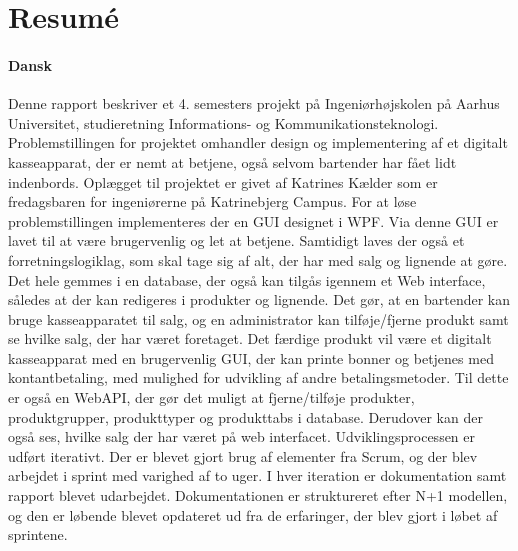\chapter{Resumé}
\subsubsection*{Dansk}

Denne rapport beskriver et 4. semesters projekt på Ingeniørhøjskolen på Aarhus Universitet, studieretning Informations- og Kommunikationsteknologi. 
Problemstillingen for projektet omhandler design og implementering af et digitalt kasseapparat, der er nemt at betjene, også selvom bartender har fået lidt indenbords. 
Oplægget til projektet er givet af Katrines Kælder som er fredagsbaren for ingeniørerne på Katrinebjerg Campus.
\newline
\newline
For at løse problemstillingen implementeres der en \gls{GUI} designet i \gls{WPF}. Via denne 
\gls{GUI} er lavet til at være brugervenlig og let at betjene. 
Samtidigt laves der også et forretningslogiklag, som skal tage sig af alt, der har med salg og lignende at gøre. 
Det hele gemmes i en database, der også kan tilgås igennem et Web interface, således at der kan redigeres i produkter og lignende. 
Det gør, at en bartender kan bruge kasseapparatet til salg, og en administrator kan tilføje/fjerne produkt samt se hvilke salg, der har været foretaget.
\newline
\newline
Det færdige produkt vil være et digitalt kasseapparat med en brugervenlig \gls{GUI}, 
der kan printe bonner og betjenes med kontantbetaling, med mulighed for udvikling af andre betalingsmetoder. 
Til dette er også en \gls{WebAPI}, der gør det muligt at fjerne/tilføje produkter, produktgrupper, produkttyper og produkttabs i database. 
Derudover kan der også ses, hvilke salg der har været på web interfacet.
\newline
\newline
Udviklingsprocessen er udført iterativt. 
Der er blevet gjort brug af elementer fra Scrum, og der blev arbejdet i sprint med varighed af to uger. 
I hver iteration er dokumentation samt rapport blevet udarbejdet. 
Dokumentationen er struktureret efter N+1 modellen, og den er løbende blevet opdateret ud fra de erfaringer, der blev gjort i løbet af sprintene.   
\newline
\newline
















